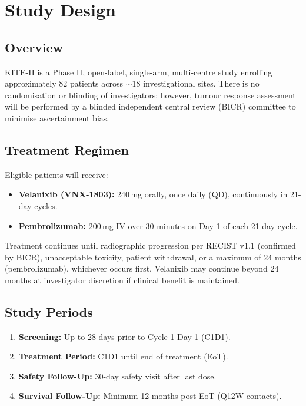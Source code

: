 \section{Study Design}
\label{sec:design}

\subsection{Overview}

KITE-II is a Phase II, open-label, single-arm, multi-centre study enrolling approximately 82 patients across $\sim$18 investigational sites. There is no randomisation or blinding of investigators; however, tumour response assessment will be performed by a blinded independent central review (BICR) committee to minimise ascertainment bias.

\subsection{Treatment Regimen}

Eligible patients will receive:

\begin{itemize}
  \item \textbf{Velanixib (VNX-1803):} 240\,mg orally, once daily (QD), continuously in 21-day cycles.
  \item \textbf{Pembrolizumab:} 200\,mg IV over 30 minutes on Day 1 of each 21-day cycle.
\end{itemize}

Treatment continues until radiographic progression per RECIST v1.1 (confirmed by BICR), unacceptable toxicity, patient withdrawal, or a maximum of 24 months (pembrolizumab), whichever occurs first. Velanixib may continue beyond 24 months at investigator discretion if clinical benefit is maintained.

\subsection{Study Periods}

\begin{enumerate}
  \item \textbf{Screening:} Up to 28 days prior to Cycle 1 Day 1 (C1D1).
  \item \textbf{Treatment Period:} C1D1 until end of treatment (EoT).
  \item \textbf{Safety Follow-Up:} 30-day safety visit after last dose.
  \item \textbf{Survival Follow-Up:} Minimum 12 months post-EoT (Q12W contacts).
\end{enumerate}

